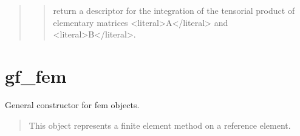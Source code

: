 \documentclass[a4paper,11pt,english]{sphinxmanual}
\begin{document}
\begin{quote}
\sphinxAtStartPar
{}
\begin{quote}

\sphinxAtStartPar
return a descriptor for the integration of the tensorial product of
elementary matrices \textless{}literal\textgreater{}A\textless{}/literal\textgreater{} and \textless{}literal\textgreater{}B\textless{}/literal\textgreater{}.
\end{quote}
\end{quote}


\section{gf\_fem}
\label{\detokenize{scilab/cmdref_gf_fem:gf-fem}}\label{\detokenize{scilab/cmdref_gf_fem::doc}}
\sphinxAtStartPar
{}

\begin{sphinxVerbatim}[commandchars=\\\{\}]
       \PYG{p}{[} \PYG{p}{[}  \PYG{p}{]}\PYG{p}{]}
          \PYG{p}{[}  \PYG{p}{[}  \PYG{p}{]}\PYG{p}{]}
   
\end{sphinxVerbatim}

\sphinxAtStartPar
{}

\sphinxAtStartPar
General constructor for fem objects.
\begin{quote}

\sphinxAtStartPar
This object represents a finite element method on a reference element.
\end{quote}
\end{document}

